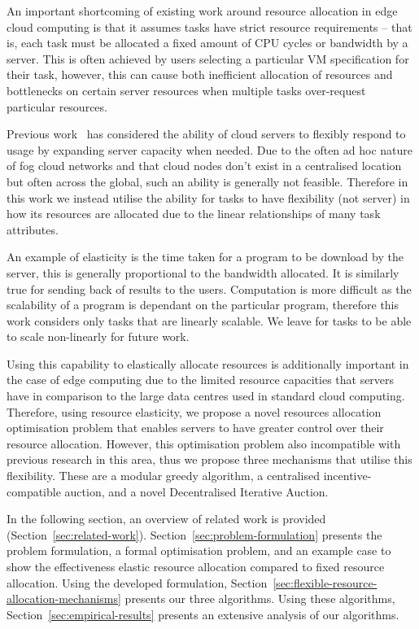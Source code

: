 An important shortcoming of existing work around resource allocation in edge cloud computing is that it assumes tasks
have strict resource requirements -- that is, each task must be allocated a fixed amount of CPU cycles or bandwidth by a
server. This is often achieved by users selecting a particular VM specification for their task, however, this can cause
both inefficient allocation of resources and bottlenecks on certain server resources when multiple tasks over-request
particular resources.

Previous work~\cite{ServerElasticity} has considered the ability of cloud servers to flexibly respond to usage by
expanding server capacity when needed. Due to the often ad hoc nature of fog cloud networks and that cloud nodes don't
exist in a centralised location but often across the global, such an ability is generally not feasible. Therefore in
this work we instead utilise the ability for tasks to have flexibility (not server) in how its resources are allocated
due to the linear relationships of many task attributes.

An example of elasticity is the time taken for a program to be download by the server, this is generally proportional
to the bandwidth allocated. It is similarly true for sending back of results to the users. Computation is more
difficult as the scalability of a program is dependant on the particular program, therefore this
work considers only tasks that are linearly scalable. We leave for tasks to be able to scale non-linearly for future
work.

Using this capability to elastically allocate resources is additionally important in the case of edge computing due to
the limited resource capacities that servers have in comparison to the large data centres used in standard cloud
computing. Therefore, using resource elasticity, we propose a novel resources allocation optimisation problem that
enables servers to have greater control over their resource allocation. However, this optimisation problem also
incompatible with previous research in this area, thus we propose three mechanisms that utilise this flexibility. These
are a modular greedy algorithm, a centralised incentive-compatible auction, and a novel Decentralised Iterative Auction.

In the following section, an overview of related work is provided (Section~\ref{sec:related-work}).
Section~\ref{sec:problem-formulation} presents the problem formulation, a formal optimisation problem, and an example
case to show the effectiveness elastic resource allocation compared to fixed resource allocation. Using the developed
formulation, Section~\ref{sec:flexible-resource-allocation-mechanisms} presents our three algorithms. Using these
algorithms, Section~\ref{sec:empirical-results} presents an extensive analysis of our algorithms.
